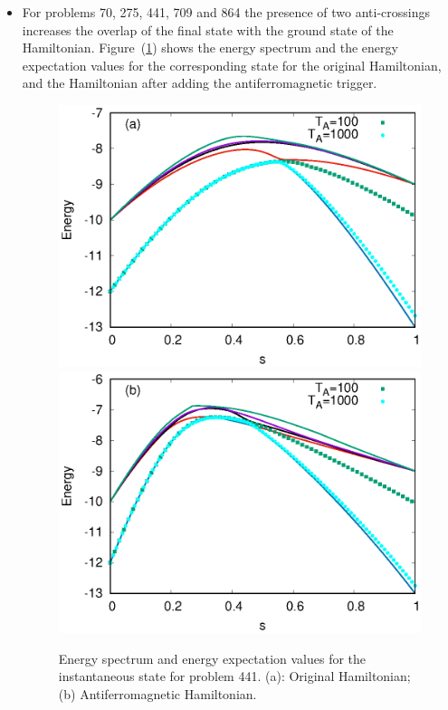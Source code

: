\documentclass[../main.tex]{subfiles}
\begin{document}
\begin{itemize}
\item For problems 70, 275, 441, 709 and 864 the presence of two anti-crossings increases the overlap of the final state with the ground state of the Hamiltonian. Figure~(\ref{fig:a28}) shows the energy spectrum and the energy expectation values for the corresponding state for the original Hamiltonian, and the Hamiltonian after adding the antiferromagnetic trigger.


\begin{figure}
\centering 
\includegraphics[scale=0.8]{441_O_T.eps}
\includegraphics[scale=0.8]{441_A_g1_T100_1000.eps}
\caption{Energy spectrum and energy expectation values for the instantaneous state for problem 441. (a): Original Hamiltonian; (b) Antiferromagnetic Hamiltonian.}
\label{fig:a28}
\end{figure}



\end{itemize}
\end{document}
